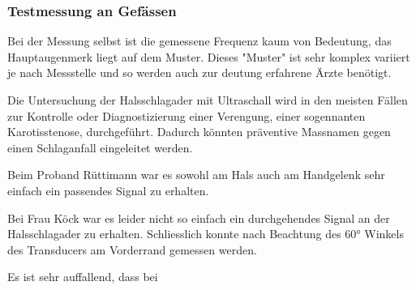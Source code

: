 \documentclass[11pt]{scrartcl}
\begin{document}
    \subsubsection{Testmessung an Gefässen}
    Bei der Messung selbst ist die gemessene Frequenz kaum von Bedeutung, das Hauptaugenmerk liegt auf dem Muster.
    Dieses "Muster" ist sehr komplex variiert je nach Messstelle und so werden auch zur deutung
    erfahrene Ärzte benötigt.

    Die Untersuchung der Halsschlagader mit Ultraschall wird in den meisten Fällen zur Kontrolle oder Diagnostizierung
    einer Verengung, einer sogennanten Karotisstenose, durchgeführt.
    Dadurch könnten präventive Massnamen gegen einen Schlaganfall eingeleitet werden.


    Beim Proband Rüttimann war es sowohl am Hals auch am Handgelenk sehr einfach ein passendes Signal zu erhalten.

    Bei Frau Köck war es leider nicht so einfach ein durchgehendes Signal an der Halsschlagader zu erhalten.
    Schliesslich konnte nach Beachtung des 60° Winkels des Transducers am Vorderrand gemessen werden.

    Es ist sehr auffallend, dass bei


\end{document}
